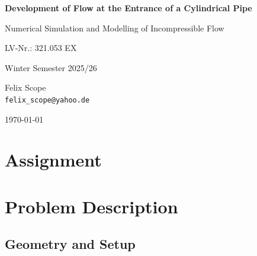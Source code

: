 \documentclass[12pt,a4paper]{article}
\begin{document}
\begin{titlepage}
    \centering
    \vspace*{2cm}

    {\Huge\bfseries Development of Flow at the Entrance of a Cylindrical Pipe\par}

    \vspace{1.5cm}

    {\Large Numerical Simulation and Modelling of Incompressible Flow\par}

    \vspace{1cm}

    {\large LV-Nr.: 321.053 EX\par}
    {\large Winter Semester 2025/26\par}

    \vfill

    {\Large
    Felix Scope\\
    \texttt{felix\_scope@yahoo.de}\\
    }

    \vfill

    {\large \today\par}
\end{titlepage}

\tableofcontents
\newpage

\section*{Assignment}


\newpage

\section{Problem Description}

\subsection{Geometry and Setup}
\end{document}
